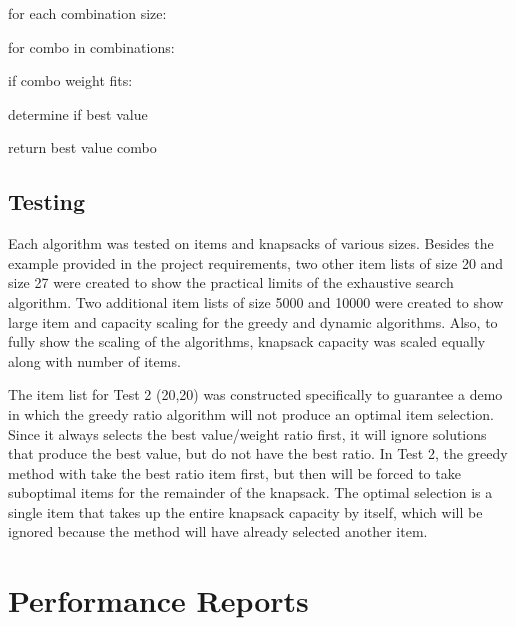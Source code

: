 \documentclass{article}
\begin{document}
\hspace{\parindent}for each combination size:

\hspace{\parindent}\hspace{\parindent}for combo in combinations:

\hspace{\parindent}\hspace{\parindent}\hspace{\parindent}if combo weight fits:

\hspace{\parindent}\hspace{\parindent}\hspace{\parindent}\hspace{\parindent}determine if best value

\hspace{\parindent}return best value combo

\subsection{Testing}
\hspace{\parindent}Each algorithm was tested on items and knapsacks of various sizes. Besides the example provided in the project requirements, two other item lists of size 20 and size 27 were created to show the practical limits of the exhaustive search algorithm. Two additional item lists of size 5000 and 10000 were created to show large item and capacity scaling for the greedy and dynamic algorithms. Also, to fully show the scaling of the algorithms, knapsack capacity was scaled equally along with number of items.

The item list for Test 2 (20,20) was constructed specifically to guarantee a demo in which the greedy ratio algorithm will not produce an optimal item selection. Since it always selects the best value/weight ratio first, it will ignore solutions that produce the best value, but do not have the best ratio. In Test 2, the greedy method with take the best ratio item first, but then will be forced to take suboptimal items for the remainder of the knapsack. The optimal selection is a single item that takes up the entire knapsack capacity by itself, which will be ignored because the method will have already selected another item.

\newpage
\section{Performance Reports}
\end{document}
